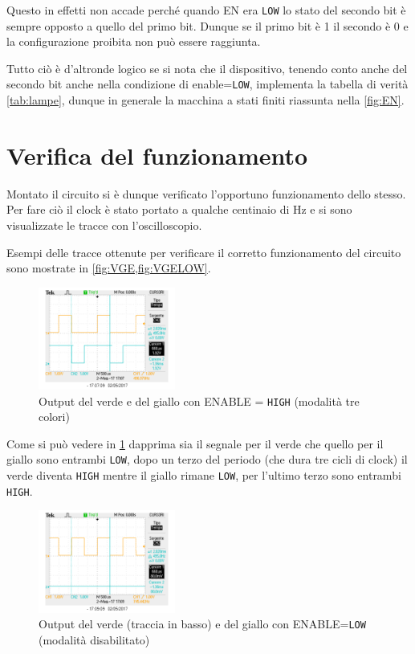 \documentclass[a4paper,10pt]{article}
\def\code#1{\texttt{#1}}
\begin{document}
Questo in effetti non accade perché quando EN era \code{LOW} lo stato del secondo bit è sempre opposto a quello del primo bit. Dunque se il primo bit è 1 il secondo è 0 e la configurazione proibita non può essere raggiunta.

Tutto ciò è d'altronde logico se si nota che il dispositivo, tenendo conto anche del secondo bit anche nella condizione di enable=\code{LOW}, implementa la tabella di verità \cref{tab:lampe}, dunque in generale la macchina a stati finiti riassunta nella \cref{fig:EN}.



\section{Verifica del funzionamento}

Montato il circuito si è dunque verificato l'opportuno funzionamento dello stesso. Per fare ciò il clock è stato portato a qualche centinaio di Hz e si sono visualizzate le tracce con l'oscilloscopio.

Esempi delle tracce ottenute per verificare il corretto funzionamento del circuito sono mostrate in \cref{fig:VGE,fig:VGELOW}.


\begin{figure}[H]
	\centering
	\includegraphics[width=0.4\textwidth]{../grafici/verde_giallo.png}
	\caption{Output del verde e del giallo con ENABLE = \code{HIGH} (modalità tre colori)}
	\label{fig:VGE}
\end{figure}


Come si può vedere in \cref{fig:VGE} dapprima sia il segnale per il verde che quello per il giallo sono entrambi \code{LOW}, dopo un terzo del periodo (che dura tre cicli di clock) il verde diventa \code{HIGH} mentre il giallo rimane \code{LOW}, per l'ultimo terzo sono entrambi \code{HIGH}.



\begin{figure}[H]
	\centering
	\includegraphics[width=0.4\textwidth]{../grafici/verde_gialloELOW.png}
	\caption{Output del verde (traccia in basso) e del giallo con ENABLE=\code{LOW} (modalità disabilitato)}
	\label{fig:VGELOW}
\end{figure}
\end{document}

